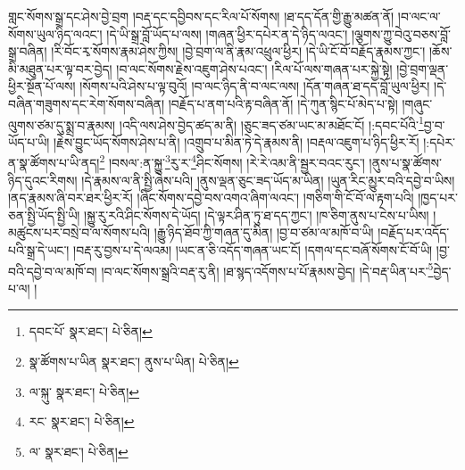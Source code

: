 གླང་སོགས་སྒྲ་དང་ཤེས་བྱེ་བྲག །བརྡ་དང་དབྱིབས་དང་རིལ་པོ་སོགས། །ཐ་དད་དོན་གྱི་རྒྱུ་མཚན་ནོ། །བ་ལང་ལ་སོགས་ཡུལ་ཉིད་ལའང་། །དེ་ཡི་སྒྲ་བློ་ཡོད་པ་ལས། །གཞན་ཕྱིར་དཔེར་ན་དེ་ཉིད་ལའང་། །ལྕགས་ཀྱུ་བེའུ་བཅས་བློ་སྒྲ་བཞིན། །རི་བོང་རྭ་སོགས་རྣམ་ཤེས་ཀྱིས། །བྱེ་བྲག་ལ་ནི་རྣམ་འཕྲུལ་ཕྱིར། །དེ་ཡི་ངོ་བོ་བརྗོད་རྣམས་ཀྱང་། །ཆོས་མི་མཐུན་པར་ལྟ་བར་བྱེད། །བ་ལང་སོགས་རྗེས་འཇུག་ཤེས་པའང་། །རིལ་པོ་ལས་གཞན་པར་སྐྱེ་སྟེ། །བྱེ་བྲག་ལྡན་ཕྱིར་སྔོན་པོ་ལས། །སོགས་པའི་ཤེས་པ་ལྟ་བུའོ། །བ་ལང་ཉིད་ནི་བ་ལང་ལས། །དོན་གཞན་ཐ་དད་བློ་ཡུལ་ཕྱིར། །དེ་བཞིན་གཟུགས་དང་རེག་སོགས་བཞིན། །བརྗོད་པ་ནག་པའི་རྟ་བཞིན་ནོ། །དེ་ཀུན་སྙིང་པོ་མེད་པ་སྟེ། །གཞུང་ལུགས་ཙམ་དུ་སྨྲ་བ་རྣམས། །འདི་ལས་ཤེས་བྱེད་ཚད་མ་ནི། །ཅུང་ཟད་ཙམ་ཡང་མ་མཐོང་ངོ། །:དབང་པོའི་\footnote{དབང་པོ་  སྣར་ཐང་།  པེ་ཅིན། }བྱ་བ་ཡོད་པ་ཡི། །རྗེས་བྱུང་ཡོད་སོགས་ཤེས་པ་ནི། །འགྲུབ་པ་མིན་ཏེ་དེ་རྣམས་ནི། །བརྡལ་འཇུག་པ་ཉིད་ཕྱིར་རོ། །:དཔེར་ན་སྣ་ཚོགས་པ་ཡི་ནད།\footnote{སྣ་ཚོགས་པ་ཡིན  སྣར་ཐང་། ནུས་པ་ཡིན།  པེ་ཅིན། } །བསལ་:ན་སྐྱུ་\footnote{ལ་སྐུ་  སྣར་ཐང་།  པེ་ཅིན། }རུ་ར་\footnote{རང་  སྣར་ཐང་།  པེ་ཅིན། }ཤིང་སོགས། །རེ་རེ་འམ་ནི་སྦྱར་བའང་རུང་། །ནུས་པ་སྣ་ཚོགས་ཉིད་དུའང་རིགས། །དེ་རྣམས་ལ་ནི་སྤྱི་ཞེས་པའི། །ནུས་ལྡན་ཅུང་ཟད་ཡོད་མ་ཡིན། །ཡུན་རིང་མྱུར་བའི་དབྱེ་བ་ཡིས། །ནད་རྣམས་ཞི་བར་ཐར་ཕྱིར་རོ། །ཞིང་སོགས་དབྱེ་བས་འགའ་ཞིག་ལའང་། །གཅིག་གི་ངོ་བོ་ལ་རྟག་པའི། །ཁྱད་པར་ཅན་སྤྱི་ཡོད་སྤྱི་ཡི། །སྐྱུ་རུ་རའི་ཤིང་སོགས་དེ་ཡོད། །དེ་ལྟར་ཤིན་ཏུ་ཐ་དད་ཀྱང་། །ཁ་ཅིག་ནུས་པ་ངེས་པ་ཡིས། །མཚུངས་པར་བསྲེ་བ་ལ་སོགས་པའི། །རྒྱུ་ཉིད་ཐོབ་ཀྱི་གཞན་དུ་མིན། །བྱ་བ་ཙམ་ལ་མཁོ་བ་ཡི། །བརྗོད་པར་འདོད་པའི་སྒྲ་དེ་ཡང་། །བརྡ་རུ་བྱས་པ་དེ་ལའམ། །ཡང་ན་ཅི་འདོད་གཞན་ཡང་ངོ། །དགལ་དང་བཞོ་སོགས་ངོ་བོ་ཡི། །བྱ་བའི་དབྱེ་བ་ལ་མཁོ་བ། །བ་ལང་སོགས་སྒྲའི་བརྡ་རུ་ནི། །ཐ་སྙད་འདོགས་པ་པོ་རྣམས་བྱེད། །དེ་བརྡ་ཡིན་པར་\footnote{ལ་  སྣར་ཐང་།  པེ་ཅིན། }བྱེད་པ་ལ། །
